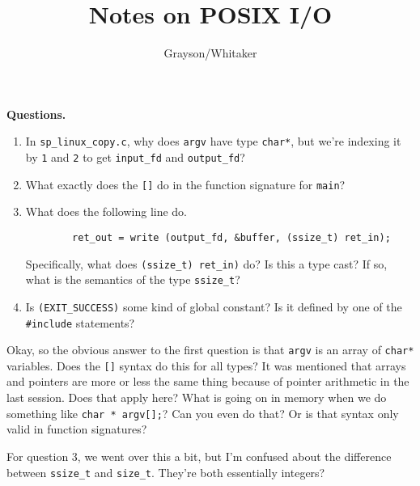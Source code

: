 \documentclass[12pt, reqno, twoside]{amsart}
\title{Notes on POSIX I/O}
\author{Grayson/Whitaker}
\newcommand{\ert}{\texttt}
\begin{document}
\maketitle
\textbf{Questions.}
\begin{enumerate}[label=\textbf{\arabic*.}]
    \item In \ert{sp\_linux\_copy.c}, why does \ert{argv} have type \ert{char*}, but we're indexing it by \ert{1} and \ert{2} to get \ert{input\_fd} and \ert{output\_fd}?
    \item What exactly does the \ert{[]} do in the function signature for \ert{main}?
    \item What does the following line do.
    \begin{verbatim}
        ret_out = write (output_fd, &buffer, (ssize_t) ret_in);
    \end{verbatim}
    Specifically, what does \ert{(ssize\_t) ret\_in)} do? Is this a type cast? If so, what is the semantics of the type \ert{ssize\_t}?
    \item Is \ert{(EXIT\_SUCCESS)} some kind of global constant? Is it defined by one of the \ert{\#include} statements?
\end{enumerate}
Okay, so the obvious answer to the first question is that \ert{argv} is an array of \ert{char*} variables. Does the \ert{[]} syntax do this for all types? It was mentioned that arrays and pointers are more or less the same thing because of pointer arithmetic in the last session. Does that apply here? What is going on in memory when we do something like \ert{char * argv[];}? Can you even do that? Or is that syntax only valid in function signatures?

For question 3, we went over this a bit, but I'm confused about the difference between \ert{ssize\_t} and \ert{size\_t}. They're both essentially integers?
\end{document}
